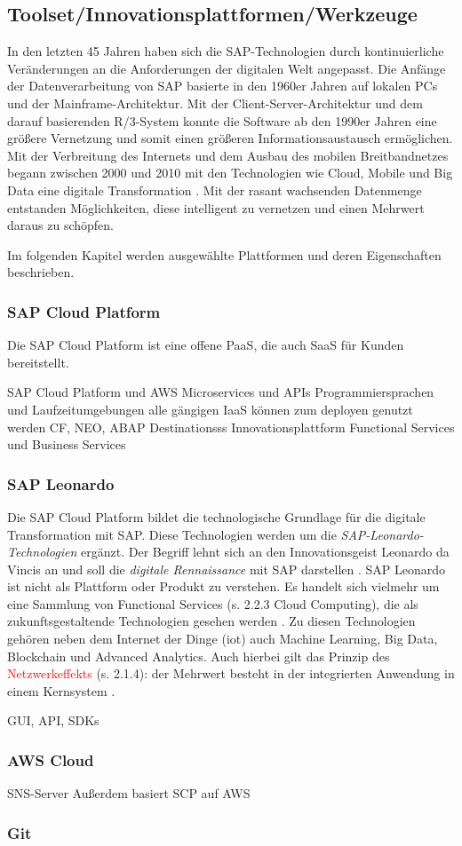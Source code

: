 \subsection{Toolset/Innovationsplattformen/Werkzeuge}
In den letzten 45 Jahren haben sich die SAP-Technologien durch kontinuierliche Veränderungen an die Anforderungen der digitalen Welt angepasst. Die Anfänge der Datenverarbeitung von SAP basierte in den 1960er Jahren auf lokalen PCs und der Mainframe-Architektur. Mit der Client-Server-Architektur und dem darauf basierenden R/3-System konnte die Software ab den 1990er Jahren eine größere Vernetzung und somit einen größeren Informationsaustausch ermöglichen. Mit der Verbreitung des Internets und dem Ausbau des mobilen Breitbandnetzes begann zwischen 2000 und 2010 mit den Technologien wie Cloud, Mobile und Big Data eine digitale Transformation \citep[S. 44]{Elsner2018}. Mit der rasant wachsenden Datenmenge entstanden Möglichkeiten, diese intelligent zu vernetzen und einen Mehrwert daraus zu schöpfen.

Im folgenden Kapitel werden ausgewählte Plattformen und deren Eigenschaften beschrieben.

\subsubsection{SAP Cloud Platform}

Die SAP Cloud Platform ist eine offene PaaS, die auch SaaS für Kunden bereitstellt.

SAP Cloud Platform und AWS Microservices und APIs
Programmiersprachen und Laufzeitumgebungen
alle gängigen IaaS können zum deployen genutzt werden
CF, NEO, ABAP
Destinationsss
Innovationsplattform
Functional Services und Business Services
\subsubsection{SAP Leonardo}

Die SAP Cloud Platform bildet die technologische Grundlage für die digitale Transformation mit SAP. Diese
Technologien werden um die \textit{SAP-Leonardo-Technologien} ergänzt. Der Begriff lehnt sich an den Innovationsgeist Leonardo da Vincis an und soll die \textit{digitale Rennaissance} mit SAP  darstellen \citep{Howells2017}.
SAP Leonardo ist nicht als Plattform oder Produkt zu verstehen. Es handelt sich vielmehr um eine Sammlung von Functional Services (s. 2.2.3 Cloud Computing), die als zukunftsgestaltende Technologien gesehen werden \citep{Elsner2018}. Zu diesen Technologien
gehören neben dem Internet der Dinge (\acf{iot}) auch Machine Learning, Big Data, Blockchain und Advanced Analytics.
Auch hierbei gilt das Prinzip des \textcolor{red}{Netzwerkeffekts} (s. 2.1.4): der Mehrwert besteht in der integrierten Anwendung in einem Kernsystem \citep{Elsner2018}.

GUI, API, SDKs

\subsubsection{AWS Cloud}
SNS-Server
Außerdem basiert SCP auf AWS

\subsubsection{Git}

\newpage
